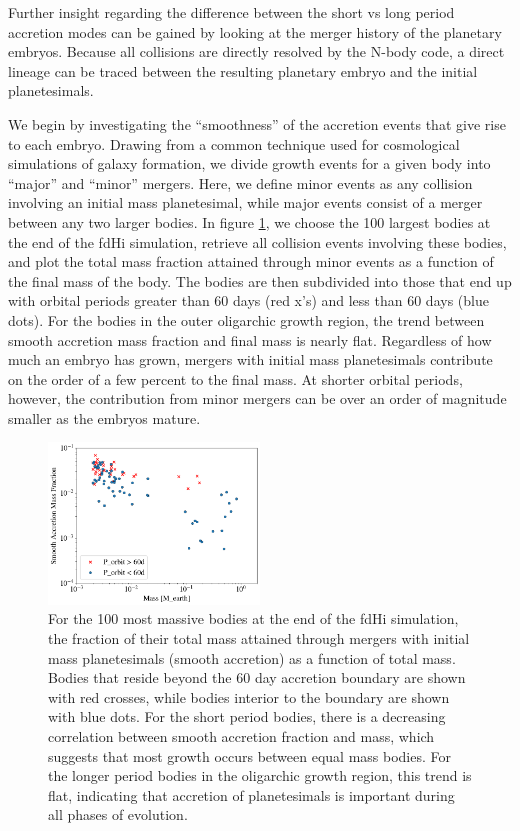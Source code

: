 \documentclass[twocolumn]{aastex63}
\begin{document}
Further insight regarding the difference between the short vs long period accretion modes can be gained by looking at the merger history of the planetary embryos. Because all collisions are directly resolved by the N-body code, a direct lineage can be traced between the resulting planetary embryo and the initial planetesimals.

We begin by investigating the ``smoothness'' of the accretion events
that give rise to each embryo. Drawing from a common technique used
for cosmological simulations of galaxy formation, we divide growth events for
a given body into ``major'' and ``minor'' mergers. Here, we define minor events as any collision involving an initial mass 
planetesimal, while major events consist of a merger between any two larger bodies. In figure \ref{fig:minor_frac}, we choose the 
100 largest bodies at the end of the fdHi simulation, retrieve all collision events involving these bodies, and plot the total mass 
fraction attained through minor events as a function of the final mass of the body. The bodies are then subdivided into those that 
end up with orbital periods greater than 60 days (red x's) and less than 60 days (blue dots). For the bodies in the outer oligarchic 
growth region, the trend between smooth accretion mass fraction and final mass is nearly flat. Regardless of how much an 
embryo has grown, mergers with initial mass planetesimals contribute on the order of a few percent to the final mass.
At shorter orbital periods, however, the contribution from minor mergers can be over an order of magnitude smaller as the 
embryos mature.

\begin{figure}
\begin{center}
    \includegraphics[width=0.5\textwidth]{figures/minor_frac.png}
    \caption{For the 100 most massive bodies at the end of the fdHi simulation, the fraction of their total mass attained through mergers with initial mass planetesimals (smooth accretion) as a function of total mass. Bodies that reside beyond the 60 day accretion boundary are shown with red crosses, while bodies interior to the boundary are shown with blue dots. For the short period bodies, there is a decreasing correlation between smooth accretion fraction and mass, which suggests that most growth occurs between equal mass bodies. For the longer period bodies in the oligarchic growth region, this trend is flat, indicating that accretion of planetesimals is important during all phases of evolution.\label{fig:minor_frac}}
\end{center}
\end{figure}
\end{document}
